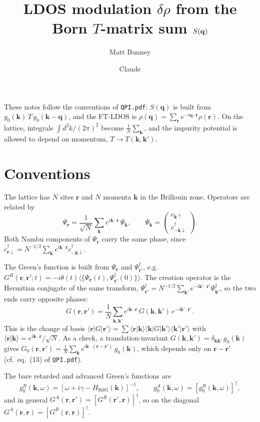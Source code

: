 \documentclass[11pt]{article}
\title{LDOS modulation $\delta\rho$ from the Born $T$-matrix sum $S(\bq)$}
\author{Matt Bunney \and Claude}
\date{}
\newcommand{\bk}{\mathbf{k}}
\newcommand{\bq}{\mathbf{q}}
\newcommand{\br}{\mathbf{r}}
\newcommand{\GR}{G^{R}}
\newcommand{\GA}{G^{A}}
\begin{document}
\maketitle

These notes follow the conventions of \texttt{QPI.pdf}: $S(\bq)$ is built from $g_0(\bk)\,T\,g_0(\bk-\bq)$, and the FT-LDOS is $\rho(\bq) = \sum_{\br} e^{-i\bq\cdot\br}\rho(\br)$. On the lattice, integrals $\int d^2k/(2\pi)^2$ become $\frac{1}{N}\sum_{\bk}$, and the impurity potential is allowed to depend on momentum, $T \to T(\bk,\bk')$.

\section{Conventions}

The lattice has $N$ sites $\br$ and $N$ momenta $\bk$ in the Brillouin zone. Operators are related by
\begin{equation}
  \Psi_{\br} = \frac{1}{\sqrt{N}} \sum_{\bk} e^{i\bk\cdot\br}\, \Psi_{\bk},
  \qquad
  \Psi_{\bk} = \begin{pmatrix} c_{\bk\uparrow} \\ c^{\dagger}_{-\bk\downarrow} \end{pmatrix}.
\end{equation}
Both Nambu components of $\Psi_{\br}$ carry the same phase, since $c^{\dagger}_{\br\downarrow} = N^{-1/2}\sum_{\bk} e^{i\bk\cdot\br} c^{\dagger}_{-\bk\downarrow}$.

The Green's function is built from $\Psi_{\br}$ and $\Psi^{\dagger}_{\br'}$, e.g.\ $\GR(\br,\br';t) = -i\theta(t)\langle\{\Psi_{\br}(t), \Psi^{\dagger}_{\br'}(0)\}\rangle$. The creation operator is the Hermitian conjugate of the same transform, $\Psi^{\dagger}_{\br'} = N^{-1/2}\sum_{\bk'} e^{-i\bk'\cdot\br'}\Psi^{\dagger}_{\bk'}$, so the two ends carry opposite phases:
\begin{equation}
  G(\br,\br') = \frac{1}{N}\sum_{\bk,\bk'} e^{i\bk\cdot\br}\, G(\bk,\bk')\, e^{-i\bk'\cdot\br'} .
  \label{eq:G_rr}
\end{equation}
This is the change of basis $\langle\br|G|\br'\rangle = \sum \langle\br|\bk\rangle\langle\bk|G|\bk'\rangle\langle\bk'|\br'\rangle$ with $\langle\br|\bk\rangle = e^{i\bk\cdot\br}/\sqrt{N}$. As a check, a translation-invariant $G(\bk,\bk') = \delta_{\bk\bk'}\,g_0(\bk)$ gives $G_0(\br,\br') = \frac{1}{N}\sum_{\bk} e^{i\bk\cdot(\br-\br')}\,g_0(\bk)$, which depends only on $\br-\br'$ (cf.\ eq.~(13) of \texttt{QPI.pdf}).

The bare retarded and advanced Green's functions are
\begin{equation}
  g^R_0(\bk,\omega) = \left[\omega + i\gamma - H_{\mathrm{BdG}}(\bk)\right]^{-1},
  \qquad
  g^A_0(\bk,\omega) = \left[g^R_0(\bk,\omega)\right]^{\dagger},
\end{equation}
and in general $\GA(\br,\br') = [\GR(\br',\br)]^{\dagger}$, so on the diagonal $\GA(\br,\br) = [\GR(\br,\br)]^{\dagger}$.
\end{document}
